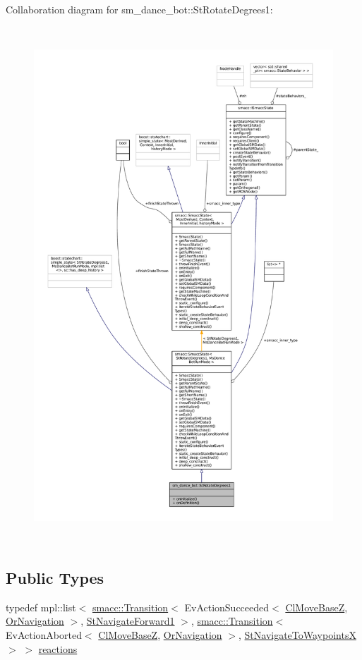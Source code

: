 Collaboration diagram for sm\+\_\+dance\+\_\+bot\+:\+:St\+Rotate\+Degrees1\+:
\nopagebreak
\begin{figure}[H]
\begin{center}
\leavevmode
\includegraphics[height=550pt]{structsm__dance__bot_1_1StRotateDegrees1__coll__graph}
\end{center}
\end{figure}
\subsection*{Public Types}
\begin{DoxyCompactItemize}
\item 
typedef mpl\+::list$<$ \hyperlink{classsmacc_1_1Transition}{smacc\+::\+Transition}$<$ Ev\+Action\+Succeeded$<$ \hyperlink{classmove__base__z__client_1_1ClMoveBaseZ}{Cl\+Move\+BaseZ}, \hyperlink{classsm__dance__bot_1_1OrNavigation}{Or\+Navigation} $>$, \hyperlink{structsm__dance__bot_1_1StNavigateForward1}{St\+Navigate\+Forward1} $>$, \hyperlink{classsmacc_1_1Transition}{smacc\+::\+Transition}$<$ Ev\+Action\+Aborted$<$ \hyperlink{classmove__base__z__client_1_1ClMoveBaseZ}{Cl\+Move\+BaseZ}, \hyperlink{classsm__dance__bot_1_1OrNavigation}{Or\+Navigation} $>$, \hyperlink{structsm__dance__bot_1_1StNavigateToWaypointsX}{St\+Navigate\+To\+WaypointsX} $>$ $>$ \hyperlink{structsm__dance__bot_1_1StRotateDegrees1_aa7f3d798f5f408a14267e7c130a6a7e6}{reactions}
\end{DoxyCompactItemize}
